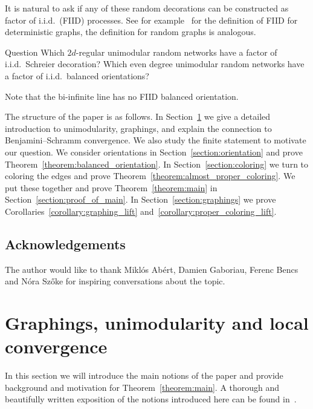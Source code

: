 \noindent It is natural to ask if any of these random decorations can be constructed as factor of i.i.d.\ (FIID) processes. See for example~\cite{csoka2017invariant} for the definition of FIID for deterministic graphs, the definition for random graphs is analogous.

\begin{enonce*}{Question}
Which $2d$-regular unimodular random networks have a factor of i.i.d.\ Schreier decoration? Which even degree unimodular random networks have a factor of i.i.d.\ balanced orientations?
\end{enonce*}

\noindent Note that the bi-infinite line has no FIID balanced orientation.

\goodbreak

The structure of the paper is as follows. In Section~\ref{section:preliminaries} we give a detailed introduction to unimodularity, graphings, and explain the connection to Benjamini--Schramm convergence. We also study the finite statement to motivate our question. We consider orientations in Section~\ref{section:orientation} and prove Theorem~\ref{theorem:balanced_orientation}. In Section~\ref{section:coloring} we turn to coloring the edges and prove Theorem~\ref{theorem:almost_proper_coloring}. We put these together and prove Theorem~\ref{theorem:main} in Section~\ref{section:proof_of_main}. In Section~\ref{section:graphings} we prove Corollaries~\ref{corollary:graphing_lift} and~\ref{corollary:proper_coloring_lift}.


\subsection*{Acknowledgements}
The author would like to thank Miklós Abért, Damien Gaboriau, Ferenc Bencs and Nóra Sz{\H o}ke for inspiring conversations about the topic.

\section{Graphings, unimodularity and local convergence} \label{section:preliminaries}

In this section we will introduce the main notions of the paper and provide background and motivation for Theorem~\ref{theorem:main}. A thorough and beautifully written exposition of the notions introduced here can be found in~\cite{lovasz2012large}.

